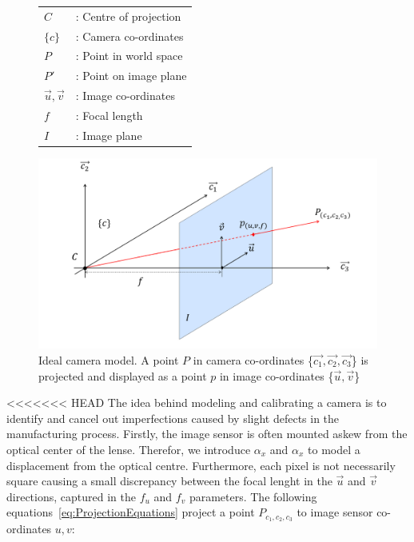 \documentclass{UoNMCHA}
\numberwithin{equation}{section}
\begin{document}
\begin{figure}[ht]
	\begin{minipage}[c]{0.3\linewidth}
		\centering
		\begin{tabular}{l l}
			$C$ &: Centre of projection\\
			$\{c\}$ &: Camera co-ordinates\\
			$P$ &: Point in world space\\
			$P'$ &: Point on image plane\\
			$\vec{u}, \vec{v}$ &: Image co-ordinates\\
			$f$ &: Focal length\\
			$I$ &: Image plane
		\end{tabular}
	\end{minipage}
	\begin{minipage}[c]{0.65\linewidth}
		\includegraphics[width=1\linewidth]{Figures/Planar_Model}	
	\end{minipage}
\caption{Ideal camera model. A point $P$ in camera co-ordinates \{$\vec{c_{1}}, \vec{c_{2}}, \vec{c_{3}}$\} is projected and displayed as a point $p$ in image co-ordinates \{$\vec{u}, \vec{v}$\}}
\label{fig:PlainarModel}
\end{figure}
<<<<<<< HEAD
The idea behind modeling and calibrating a camera is to identify and cancel out imperfections caused by slight defects in the manufacturing process. Firstly, the image sensor is often mounted askew from the optical center of the lense. Therefor, we introduce $\alpha_{x}$ and $\alpha_{x}$ to model a displacement from the optical centre. Furthermore, each pixel is not necessarily square causing a small discrepancy between the focal lenght in the $\vec{u}$ and $\vec{v}$ directions, captured in the $f_{u}$ and $f_{v}$ parameters. The following equations~\ref{eq:ProjectionEquations} project a point $P_{c_{1}, c_{2}, c_{3}}$ to image sensor co-ordinates $u, v$:
\end{document}
